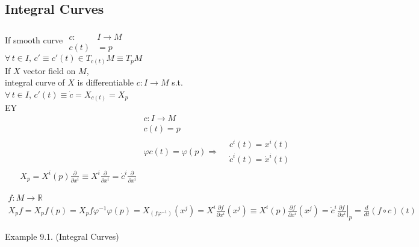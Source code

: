 

\subsection*{Integral Curves }

If smooth curve $ \begin{aligned} & \quad \\ 
 c:  & I \to M \\  
 c(t) & = p \end{aligned}$ \\
$\forall \, t \in I ,  \, c' \equiv c'(t) \in T_{c(t)}M \equiv T_p M$ \\

If $X$ vector field on $M$, \\
integral curve of $X$ is differentiable $c: I  \to M$ s.t. \\
\quad $\forall \, t \in I$, $c'(t) \equiv \dot{c} = X_{c(t)} = X_p$  \\

EY  \\
\[
\begin{aligned}
  & c:I \to M \\ 
  & c(t) = p  \\
  & \varphi c(t) = \varphi(p) \Longrightarrow \begin{aligned} & c^i(t) = x^i(t) \\
    & \dot{c}^i(t) = \dot{x}^i(t) \end{aligned} \\
  X_p = X^i(p) \frac{ \partial }{ \partial x^i } \equiv X^i \frac{ \partial }{ \partial x^i } = \dot{c}^i \frac{ \partial }{ \partial x^i } 
\end{aligned}
\]

\[
\begin{gathered}
  f: M \to \mathbb{R} \\ 
  X_p f = X_p f(p) = X_pf \varphi^{-1} \varphi(p) = X_(f\varphi^{-1})(x^j) = X^i \frac{ \partial f}{ \partial x^i }(x^j) \equiv X^i(p)  \frac{ \partial f}{ \partial x^i}(x^j) = \dot{c}^i \left. \frac{ \partial f}{ \partial x^i} \right|_p = \frac{d}{dt}( f \circ c)(t)
\end{gathered}
\]




Example 9.1.  (Integral Curves)

